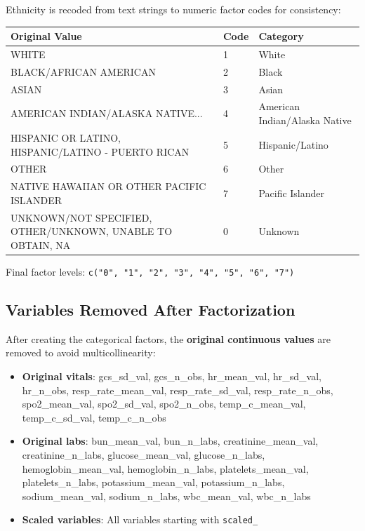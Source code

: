 \documentclass[11pt]{article}
\begin{document}
Ethnicity is recoded from text strings to numeric factor codes for consistency:

\begin{longtable}{L{6cm}L{2cm}L{6cm}}
\toprule
\textbf{Original Value} & \textbf{Code} & \textbf{Category} \\
\midrule
\endhead
WHITE & 1 & White \\
BLACK/AFRICAN AMERICAN & 2 & Black \\
ASIAN & 3 & Asian \\
AMERICAN INDIAN/ALASKA NATIVE... & 4 & American Indian/Alaska Native \\
HISPANIC OR LATINO, HISPANIC/LATINO - PUERTO RICAN & 5 & Hispanic/Latino \\
OTHER & 6 & Other \\
NATIVE HAWAIIAN OR OTHER PACIFIC ISLANDER & 7 & Pacific Islander \\
UNKNOWN/NOT SPECIFIED, OTHER/UNKNOWN, UNABLE TO OBTAIN, NA & 0 & Unknown \\
\bottomrule
\end{longtable}

Final factor levels: \texttt{c("0", "1", "2", "3", "4", "5", "6", "7")}

\subsection{Variables Removed After Factorization}

After creating the categorical factors, the \textbf{original continuous values} are removed to avoid multicollinearity:

\begin{itemize}[leftmargin=*, nosep]
    \item \textbf{Original vitals}: gcs\_sd\_val, gcs\_n\_obs, hr\_mean\_val, hr\_sd\_val, hr\_n\_obs, resp\_rate\_mean\_val, resp\_rate\_sd\_val, resp\_rate\_n\_obs, spo2\_mean\_val, spo2\_sd\_val, spo2\_n\_obs, temp\_c\_mean\_val, temp\_c\_sd\_val, temp\_c\_n\_obs
    \item \textbf{Original labs}: bun\_mean\_val, bun\_n\_labs, creatinine\_mean\_val, creatinine\_n\_labs, glucose\_mean\_val, glucose\_n\_labs, hemoglobin\_mean\_val, hemoglobin\_n\_labs, platelets\_mean\_val, platelets\_n\_labs, potassium\_mean\_val, potassium\_n\_labs, sodium\_mean\_val, sodium\_n\_labs, wbc\_mean\_val, wbc\_n\_labs
    \item \textbf{Scaled variables}: All variables starting with \texttt{scaled\_}
\end{itemize}
\end{document}
